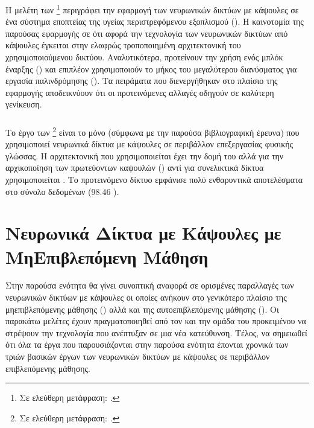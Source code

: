 Η μελέτη των  \footnote{Σε ελεύθερη μετάφραση: .} \cite{zhu2019convolutional} περιγράφει την εφαρμογή των νευρωνικών δικτύων με κάψουλες σε ένα σύστημα εποπτείας της υγείας περιστρεφόμενου εξοπλισμού (). Η καινοτομία της παρούσας εφαρμογής σε ότι αφορά την τεχνολογία των νευρωνικών δικτύων από κάψουλες έγκειται στην ελαφρώς τροποποιημένη αρχιτεκτονική του χρησιμοποιούμενου δικτύου. Αναλυτικότερα, προτείνουν την χρήση ενός μπλόκ έναρξης () και επιπλέον χρησιμοποιούν το μήκος του μεγαλύτερου διανύσματος για εργασία παλινδρόμησης (). Τα πειράματα που διενεργήθηκαν στο πλαίσιο της εφαρμογής αποδεικνύουν ότι οι προτεινόμενες αλλαγές οδηγούν σε καλύτερη γενίκευση.


\subsubsection{}

Το έργο των  \footnote{Σε ελεύθερη μετάφραση: .} \cite{srivastava2018identifying} είναι το μόνο (σύμφωνα με την παρούσα βιβλιογραφική έρευνα) που χρησιμοποιεί νευρωνικά δίκτυα με κάψουλες σε περιβάλλον επεξεργασίας φυσικής γλώσσας. Η αρχιτεκτονική που χρησιμοποιείται έχει την δομή του \cite{sabour2017dynamic} αλλά για την αρχικοποίηση των πρωτεύοντων καψουλών () αντί για συνελικτικά δίκτυα χρησιμοποιείται . Το προτεινόμενο δίκτυο εμφάνισε πολύ ενθαρυντικά αποτελέσματα στο σύνολο δεδομένων  (98.46 ).


\section{Νευρωνικά Δίκτυα με Κάψουλες με Μη\textendash Επιβλεπόμενη Μάθηση}

Στην παρούσα ενότητα θα γίνει συνοπτική αναφορά σε ορισμένες παραλλαγές των νευρωνικών δικτύων με κάψουλες οι οποίες ανήκουν στο γενικότερο πλαίσιο της μη\textendash επιβλεπόμενης μάθησης () αλλά και της αυτο\textendash επιβλεπόμενης μάθησης (). Οι παρακάτω μελέτες έχουν πραγματοποιηθεί από τον  και την ομάδα του προκειμένου να στρέψουν την τεχνολογία που ανέπτυξαν σε μια νέα κατεύθυνση. Τέλος, να σημειωθεί ότι όλα τα έργα που παρουσιάζονται στην παρούσα ενότητα έπονται χρονικά των τριών βασικών έργων των νευρωνικών δικτύων με κάψουλες σε περιβάλλον επιβλεπόμενης μάθησης.

